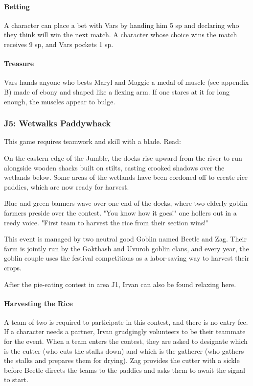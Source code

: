 \documentclass[10pt,a4paper,twoside,twocolumn,openany,nodeprecatedcode]{dndbook}
\begin{document}
\paragraph{Betting}
A character can place a bet with Vars by handing him 5 sp and declaring who they think will win the next match. A character whose choice wins the match receives 9 sp, and Vars pockets 1 sp.

\paragraph{Treasure}
Vars hands anyone who bests Maryl and Maggie a medal of muscle (see appendix B) made of ebony and shaped like a flexing arm. If one stares at it for long enough, the muscles appear to bulge.

\subsubsection{J5: Wetwalks Paddywhack}
This game requires teamwork and skill with a blade. Read:

\begin{DndReadAloud}{}
On the eastern edge of the Jumble, the docks rise upward from the river to run alongside wooden shacks built on stilts, casting crooked shadows over the wetlands below. Some areas of the wetlands have been cordoned off to create rice paddies, which are now ready for harvest.

Blue and green banners wave over one end of the docks, where two elderly goblin farmers preside over the contest. "You know how it goes!" one hollers out in a reedy voice. "First team to harvest the rice from their section wins!"

\end{DndReadAloud}

This event is managed by two neutral good Goblin named Beetle and Zag. Their farm is jointly run by the Gakthash and Uvuroh goblin clans, and every year, the goblin couple uses the festival competitions as a labor-saving way to harvest their crops.

After the pie-eating contest in area J1, Irvan can also be found relaxing here.

\paragraph{Harvesting the Rice}
A team of two is required to participate in this contest, and there is no entry fee. If a character needs a partner, Irvan grudgingly volunteers to be their teammate for the event. When a team enters the contest, they are asked to designate which is the cutter (who cuts the stalks down) and which is the gatherer (who gathers the stalks and prepares them for drying). Zag provides the cutter with a sickle before Beetle directs the teams to the paddies and asks them to await the signal to start.
\end{document}
